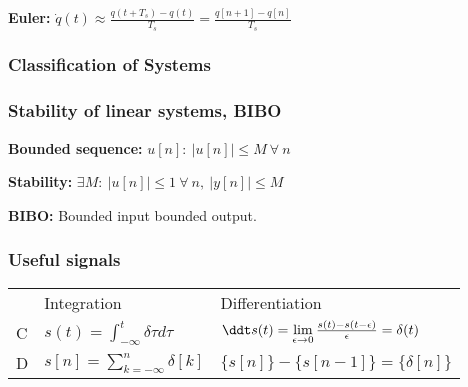 \documentclass[7pt,a4paper]{scrartcl}
\begin{document}
\begin{multicols*}{4}
\textbf{Euler:} $\dot{q}(t)\approx\frac{q(t+T_s)-q(t)}{T_s}=\frac{q[n+1]-q[n]}{T_s}$


\subsubsection*{Classification of Systems}


\subsubsection*{Stability of linear systems, BIBO}

\textbf{Bounded sequence:} $u[n]:\ |u[n]|\leq M\ \forall\ n$ 

\textbf{Stability:} $\exists M:\ |u[n]|\leq 1\ \forall\ n,\ |y[n]|\leq M$

\textbf{BIBO:} Bounded input bounded output.

\subsubsection*{Useful signals}


\small
\begin{tabular}{lll}
&Integration&Differentiation\\
C&$s(t)=\int_{-\infty}^t\delta{\tau}d\tau$&$\ddt s(t)=\lim\limits_{\epsilon\rightarrow 0}\frac{s(t)-s(t-\epsilon)}{\epsilon}=\delta(t)$\\
D&$s[n]=\sum\limits_{k=-\infty}^n\delta[k]$&$\{s[n]\}-\{s[n-1]\}=\{\delta[n]\}$
\end{tabular}
\normalsize


\end{multicols*}
\end{document}
